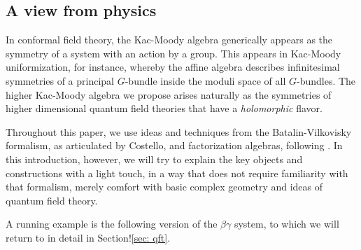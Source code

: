 


\subsection*{A view from physics}

In conformal field theory, the Kac-Moody algebra generically appears as the symmetry of a system with an action by a group. 
This appears in Kac-Moody uniformization, for instance, whereby the affine algebra describes infinitesimal symmetries of a principal $G$-bundle inside the moduli space of all $G$-bundles. 
The higher Kac-Moody algebra we propose arises naturally as the symmetries of higher dimensional quantum field theories that have a {\em holomorphic} flavor. 

Throughout this paper, we use ideas and techniques from the Batalin-Vilkovisky formalism, as articulated by Costello, and factorization algebras, following \cite{CG1,CG2}.
In this introduction, however, we will try to explain the key objects and constructions with a light touch,
in a way that does not require familiarity with that formalism,
merely comfort with basic complex geometry and ideas of quantum field theory.

A running example is the following version of the $\beta\gamma$ system, to which we will return to in detail in Section!\ref{sec: qft}.

